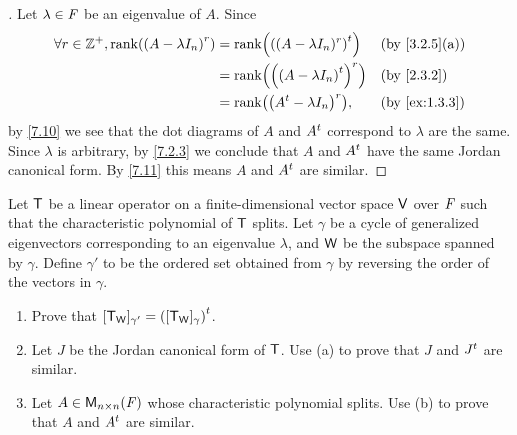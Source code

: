 \begin{proof}[]
  Let \(\lambda \in \mathit{F}\) be an eigenvalue of \(A\).
  Since
  \begin{align*}
    \forall r \in \Z^+, \rk{\pa{A - \lambda I_n}^r} & = \rk{\tp{\pa{(A - \lambda I_n)^r}}} &  & \by{3.2.5}[a] \\
                                                    & = \rk{\pa{\tp{(A - \lambda I_n)}}^r} &  & \by{2.3.2}    \\
                                                    & = \rk{\pa{\tp{A} - \lambda I_n}^r},  &  & \by{ex:1.3.3}
  \end{align*}
  by \cref{7.10} we see that the dot diagrams of \(A\) and \({A}^{t}\) correspond to \(\lambda\) are the same.
  Since \(\lambda\) is arbitrary, by \cref{7.2.3} we conclude that \(A\) and \({A}^{t}\) have the same Jordan canonical form.
  By \cref{7.11} this means \(A\) and \({A}^{t}\) are similar.
\end{proof}

\begin{ex}\label{ex:7.2.7}
  Let \(\mathsf{T}\) be a linear operator on a finite-dimensional vector space \(\mathsf{V}\) over \(\mathit{F}\) such that the characteristic polynomial of \(\mathsf{T}\) splits.
  Let \(\gamma\) be a cycle of generalized eigenvectors corresponding to an eigenvalue \(\lambda\), and \(\mathsf{W}\) be the subspace spanned by \(\gamma\).
  Define \(\gamma'\) to be the ordered set obtained from \(\gamma\) by reversing the order of the vectors in \(\gamma\).
  \begin{enumerate}
    \item Prove that \([\mathsf{T}_{\mathsf{W}}]_{\gamma'} = {([\mathsf{T}_{\mathsf{W}}]_{\gamma})}^{t}\).
    \item Let \(J\) be the Jordan canonical form of \(\mathsf{T}\).
          Use (a) to prove that \(J\) and \({J}^{t}\) are similar.
    \item Let \(A \in \ms[n][n][\F]\) whose characteristic polynomial splits.
          Use (b) to prove that \(A\) and \({A}^{t}\) are similar.
  \end{enumerate}
\end{ex}

